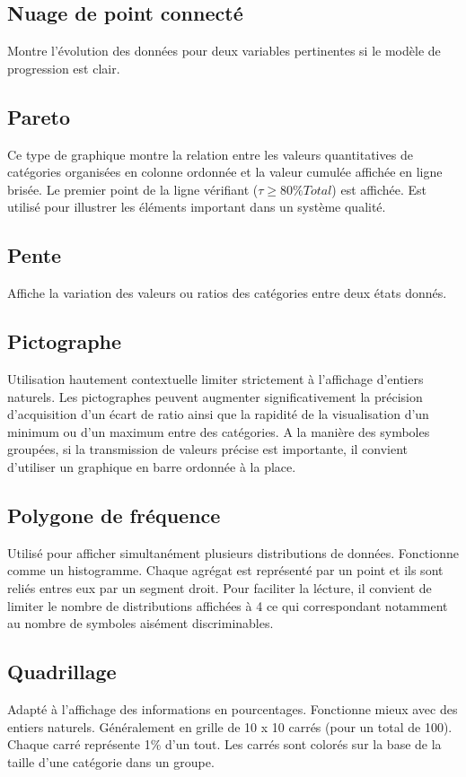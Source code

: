 \documentclass[a4paper,12pt]{article}
\begin{document}
\begin{multicols}{2}
\subsection*{Nuage de point connecté}
\label{sec:org0187af7}
Montre l'évolution des données pour deux variables pertinentes si le modèle de progression est clair. \autocite{alansmithLexiqueVisuel}
\subsection*{Pareto}
\label{sec:org8075ef8}
Ce type de graphique montre la relation entre les valeurs quantitatives de catégories organisées en colonne ordonnée et la valeur cumulée affichée en ligne brisée. Le premier point de la ligne vérifiant (\(\tau\geq80\%Total\)) est affichée. Est utilisé pour illustrer les éléments important dans un système qualité.
\subsection*{Pente}
\label{sec:orgc7a15e8}
Affiche la variation des valeurs ou ratios des catégories entre deux états donnés. \autocite{alansmithLexiqueVisuel}
\subsection*{Pictographe}
\label{sec:org83f553d}
Utilisation hautement contextuelle limiter strictement à l'affichage d'entiers naturels. \autocite{alansmithLexiqueVisuel}
Les pictographes peuvent augmenter significativement la précision d'acquisition d'un écart de ratio ainsi que la rapidité de la visualisation d'un minimum ou d'un maximum entre des catégories. \autocite{tranDiscoveringAccessibleData2024} A la manière des symboles groupées, si la transmission de valeurs précise est importante, il convient d'utiliser un graphique en barre ordonnée à la place. \autocite{tranDiscoveringAccessibleData2024}
\subsection*{Polygone de fréquence}
\label{sec:org9c3cd2d}
Utilisé pour afficher simultanément plusieurs distributions de données. Fonctionne comme un histogramme. Chaque agrégat est représenté par un point et ils sont reliés entres eux par un segment droit. Pour faciliter la lécture, il convient de limiter le nombre de distributions affichées à 4 \autocite{alansmithLexiqueVisuel} ce qui correspondant notamment au nombre de symboles aisément discriminables.
\subsection*{Quadrillage}
\label{sec:org658f3cd}
Adapté à l'affichage des informations en pourcentages. Fonctionne mieux avec des entiers naturels. \autocite{alansmithLexiqueVisuel} Généralement en grille de 10 x 10 carrés (pour un total de 100). Chaque carré représente 1\% d'un tout. Les carrés sont colorés sur la base de la taille d'une catégorie dans un groupe. \autocite{mikeyiHowChooseRight2020}

\end{multicols}
\end{document}
